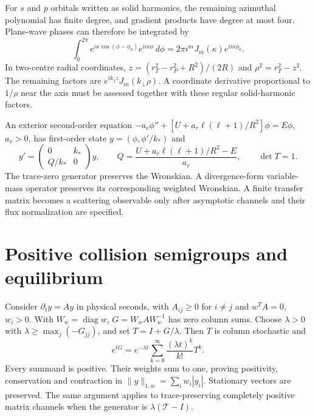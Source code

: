For $s$ and $p$ orbitals written as solid harmonics, the remaining azimuthal polynomial has finite degree, and gradient products have degree at most four. Plane-wave phases can therefore be integrated by
\begin{equation}
 \int_0^{2\pi}e^{i\kappa\cos(\phi-\phi_0)}e^{im\phi}\,d\phi
 =2\pi i^mJ_m(\kappa)e^{im\phi_0}.
 \label{v:azimuth_bessel}
\end{equation}
In two-centre radial coordinates,
$z=(r_T^2-r_P^2+R^2)/(2R)$ and $\rho^2=r_T^2-z^2$.
The remaining factors are $e^{ik_\parallel z}J_m(k_\perp\rho)$.
A coordinate derivative proportional to $1/\rho$ near the axis must be assessed together with these regular solid-harmonic factors.

An exterior second-order equation
$-a_v\phi''+[U+a_r\ell(\ell+1)/R^2]\phi=E\phi$, $a_v>0$, has first-order state $y=(\phi,\phi'/k_*)$ and
\begin{equation}
 y'=\begin{pmatrix}0&k_*\\ Q/k_*&0\end{pmatrix}y,\qquad
 Q=\frac{U+a_r\ell(\ell+1)/R^2-E}{a_v},\qquad \det T=1 .
 \label{v:exterior_transfer}
\end{equation}
The trace-zero generator preserves the Wronskian. A divergence-form variable-mass operator preserves its corresponding weighted Wronskian. A finite transfer matrix becomes a scattering observable only after asymptotic channels and their flux normalization are specified.

\section{Positive collision semigroups and equilibrium}
\label{v:positive_collisions}

Consider $\partial_ty=Ay$ in physical seconds, with $A_{ij}\ge0$ for $i\ne j$ and $w^TA=0$, $w_i>0$. With $W_w=\operatorname{diag}w$, $G=W_wAW_w^{-1}$ has zero column sums. Choose $\lambda>0$ with $\lambda\ge\max_j(-G_{jj})$, and set $T=I+G/\lambda$. Then $T$ is column stochastic and
\begin{equation}
 e^{tG}=e^{-\lambda t}\sum_{k=0}^{\infty}
 \frac{(\lambda t)^k}{k!}T^k .
 \label{v:uniformization}
\end{equation}
Every summand is positive. Their weights sum to one, proving positivity, conservation and contraction in $\|y\|_{1,w}=\sum_iw_i|y_i|$. Stationary vectors are preserved. The same argument applies to trace-preserving completely positive matrix channels when the generator is $\lambda(\mathcal T-I)$.

